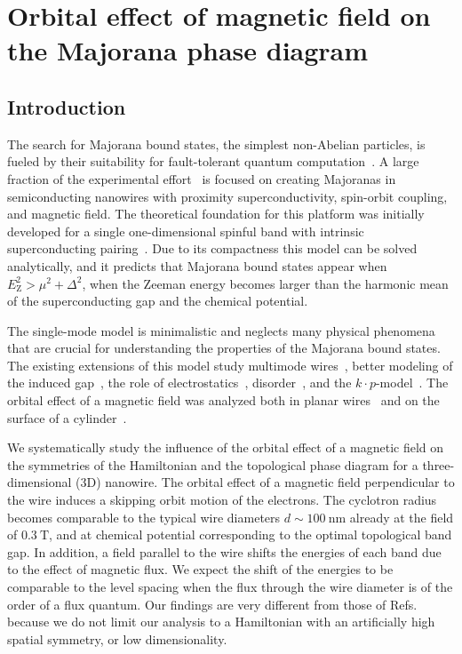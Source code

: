 \chapter{Orbital effect of magnetic field on the Majorana phase diagram}
\label{ch:orbitalfield}

\newpage
\noindent

\section{Introduction}
The search for Majorana bound states, the simplest non-Abelian particles, is fueled by their suitability for fault-tolerant quantum computation~\cite{Alicea2012,Beenakker2013}.
A large fraction of the experimental effort~\cite{Mourik2012,Das2012,Deng2012,Churchill2013,Deng2014} is focused on creating Majoranas in semiconducting nanowires with proximity superconductivity, spin-orbit coupling, and magnetic field.
The theoretical foundation for this platform was initially developed for a single one-dimensional spinful band with intrinsic superconducting pairing~\cite{Lutchyn2010,Oreg2010}.
Due to its compactness this model can be solved analytically, and it predicts that Majorana bound states appear when $E_\textrm{Z}^{2}>\mu^{2}+\Delta^{2}$, when the Zeeman energy becomes larger than the harmonic mean of the superconducting gap and the chemical potential.

The single-mode model is minimalistic and neglects many physical phenomena that are crucial for understanding the properties of the Majorana bound states.
The existing extensions of this model study multimode wires~\cite{Potter2010}, better modeling of the induced gap~\cite{Liu2012,Stanescu2014}, the role of electrostatics~\cite{Vuik2016}, disorder~\cite{Potter2012,Pientka2012,Adagideli2014}, and the $k \cdot p$-model~\cite{Stanescu2013_2}.
The orbital effect of a magnetic field was analyzed both in planar wires~\cite{Osca2015, Lim2012} and on the surface of a cylinder~\cite{Lim2013}.

We systematically study the influence of the orbital effect of a magnetic field on the symmetries of the Hamiltonian and the topological phase diagram for a three-dimensional (3D) nanowire.
The orbital effect of a magnetic field perpendicular to the wire induces a skipping orbit motion of the electrons.
The cyclotron radius becomes comparable to the typical wire diameters $d \sim \SI{100}{\nano\metre}$ already at the field of $\SI{0.3}{\tesla}$, and at chemical potential corresponding to the optimal topological band gap.
In addition, a field parallel to the wire shifts the energies of each band due to the effect of magnetic flux.
We expect the shift of the energies to be comparable to the level spacing when the flux through the wire diameter is of the order of a flux quantum.
Our findings are very different from those of Refs.~\cite{Osca2015,Lim2013,Lim2012} because we do not limit our analysis to a Hamiltonian with an artificially high spatial symmetry, or low dimensionality.


